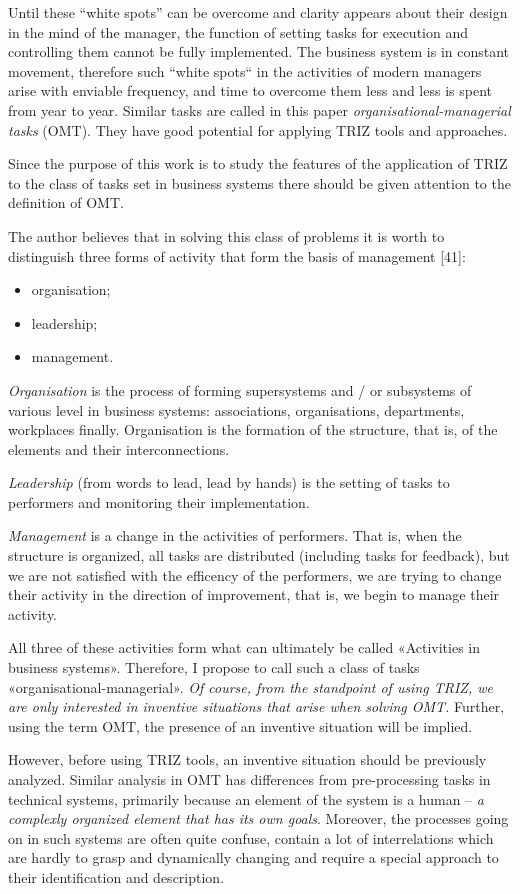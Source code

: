 \documentclass[11pt,a4paper]{book}
\begin{document}
Until these “white spots” can be overcome and clarity appears about their
design in the mind of the manager, the function of setting tasks for execution
and controlling them cannot be fully implemented. The business system is in
constant movement, therefore such “white spots“ in the activities of modern
managers arise with enviable frequency, and time to overcome them less and
less is spent from year to year. Similar tasks are called in this paper
\emph{organisational-managerial tasks} (OMT). They have good potential for
applying TRIZ tools and approaches.

Since the purpose of this work is to study the features of the application of
TRIZ to the class of tasks set in business systems there should be given
attention to the definition of OMT.

The author believes that in solving this class of problems it is worth to
distinguish three forms of activity that form the basis of management [41]:
\begin{itemize}[noitemsep]
\item organisation;
\item leadership;
\item management.
\end{itemize}
\emph{Organisation} is the process of forming supersystems and / or subsystems
of various level in business systems: associations, organisations,
departments, workplaces finally.  Organisation is the formation of the
structure, that is, of the elements and their interconnections.

\emph{Leadership} (from words to lead, lead by hands) is the setting of tasks
to performers and monitoring their implementation.

\emph{Management} is a change in the activities of performers. That is, when
the structure is organized, all tasks are distributed (including tasks for
feedback), but we are not satisfied with the efficency of the performers, we
are trying to change their activity in the direction of improvement, that is,
we begin to manage their activity.

All three of these activities form what can ultimately be called «Activities
in business systems». Therefore, I propose to call such a class of tasks
«organisational-managerial». \emph{Of course, from the standpoint of using
  TRIZ, we are only interested in inventive situations that arise when solving
  OMT.}  Further, using the term OMT, the presence of an inventive situation
will be implied.

However, before using TRIZ tools, an inventive situation should be previously
analyzed. Similar analysis in OMT has differences from pre-processing tasks in
technical systems, primarily because an element of the system is a human --
\emph{a complexly organized element that has its own goals}. Moreover, the
processes going on in such systems are often quite confuse, contain a lot of
interrelations which are hardly to grasp and dynamically changing and require
a special approach to their identification and description.
\end{document}
